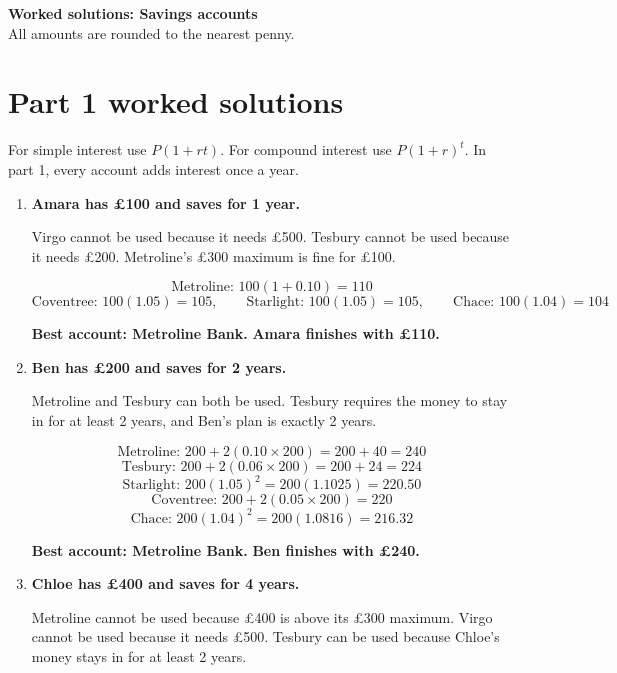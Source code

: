 \documentclass[12pt]{article}
\begin{document}
\begin{center}
  {\LARGE\bfseries Worked solutions: Savings accounts}\\[1.5mm]
  {\small All amounts are rounded to the nearest penny.}
\end{center}

\section*{Part 1 worked solutions}

For simple interest use $P(1+rt)$.  
For compound interest use $P(1+r)^t$.  
In part 1, every account adds interest once a year.

\begin{enumerate}[label=\textbf{\arabic*.}, leftmargin=4mm, itemsep=6mm, topsep=2mm]

\item \textbf{Amara has \pounds100 and saves for 1 year.}

Virgo cannot be used because it needs \pounds500.  
Tesbury cannot be used because it needs \pounds200.  
Metroline's \pounds300 maximum is fine for \pounds100.

\[
\text{Metroline: } 100(1+0.10)=110
\]
\[
\text{Coventree: } 100(1.05)=105,\qquad
\text{Starlight: } 100(1.05)=105,\qquad
\text{Chace: } 100(1.04)=104
\]

\textbf{Best account: Metroline Bank.}  
\textbf{Amara finishes with \pounds110.}

\item \textbf{Ben has \pounds200 and saves for 2 years.}

Metroline and Tesbury can both be used.  
Tesbury requires the money to stay in for at least 2 years, and Ben's plan is exactly 2 years.

\[
\text{Metroline: } 200+2(0.10\times 200)=200+40=240
\]
\[
\text{Tesbury: } 200+2(0.06\times 200)=200+24=224
\]
\[
\text{Starlight: } 200(1.05)^2=200(1.1025)=220.50
\]
\[
\text{Coventree: } 200+2(0.05\times 200)=220
\]
\[
\text{Chace: } 200(1.04)^2=200(1.0816)=216.32
\]

\textbf{Best account: Metroline Bank.}  
\textbf{Ben finishes with \pounds240.}

\item \textbf{Chloe has \pounds400 and saves for 4 years.}

Metroline cannot be used because \pounds400 is above its \pounds300 maximum.  
Virgo cannot be used because it needs \pounds500.  
Tesbury can be used because Chloe's money stays in for at least 2 years.


\end{enumerate}
\end{document}
